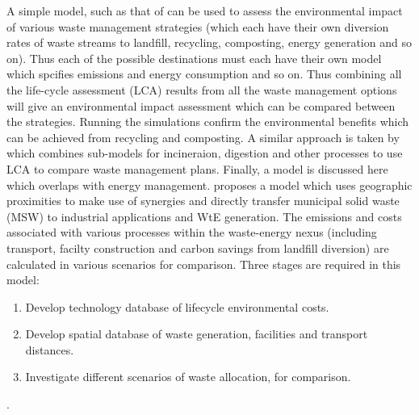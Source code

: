 A simple model, such as that of \citet{Bovea2006} can be used to assess the environmental impact of various waste management strategies (which each have their own diversion rates of waste streams to landfill, recycling, composting, energy generation and so on). Thus each of the possible destinations must each have their own model which spcifies emissions and energy consumption and so on. Thus combining all the life-cycle assessment (LCA) results from all the waste management options will give an environmental impact assessment which can be compared between the strategies. Running the simulations confirm the environmental benefits which can be achieved from recycling and composting. A similar approach is taken by \citep{Eriksson2002} which combines sub-models for incineraion, digestion and other processes to use LCA to compare waste management plans. Finally, a model is discussed here which overlaps with energy management. \citet{Geng2010} proposes a model which uses geographic proximities to make use of synergies and directly transfer municipal solid waste (MSW) to industrial applications and WtE generation. The emissions and costs associated with various processes within the waste-energy nexus (including transport, facilty construction and carbon savings from landfill diversion) are calculated in various scenarios for comparison. Three stages are required in this model:
\begin{enumerate}
	\item Develop technology database of lifecycle environmental costs.
	\item Develop spatial database of waste generation, facilities and transport distances.
	\item Investigate different scenarios of waste allocation, for comparison.
\end{enumerate}.
	
		

